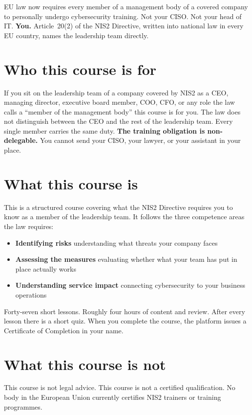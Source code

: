 \documentclass[11pt,a4paper,twoside]{book}
\begin{document}
EU law now requires every member of a management body of a covered company to personally undergo cybersecurity training. Not your CISO. Not your head of IT. \textbf{You.} Article~20(2) of the NIS2 Directive, written into national law in every EU country, names the leadership team directly.

\section*{Who this course is for}

If you sit on the leadership team of a company covered by NIS2 as a CEO, managing director, executive board member, COO, CFO, or any role the law calls a ``member of the management body''  this course is for you. The law does not distinguish between the CEO and the rest of the leadership team. Every single member carries the same duty. \textbf{The training obligation is non-delegable.} You cannot send your CISO, your lawyer, or your assistant in your place.

\section*{What this course is}

This is a structured course covering what the NIS2 Directive requires you to know as a member of the leadership team. It follows the three competence areas the law requires:
\begin{itemize}
  \item \textbf{Identifying risks} understanding what threats your company faces
  \item \textbf{Assessing the measures} evaluating whether what your team has put in place actually works
  \item \textbf{Understanding service impact} connecting cybersecurity to your business operations
\end{itemize}

Forty-seven short lessons. Roughly four hours of content and review. After every lesson there is a short quiz. When you complete the course, the platform issues a Certificate of Completion in your name.

\section*{What this course is not}

This course is not legal advice. This course is not a certified qualification. No body in the European Union currently certifies NIS2 trainers or training programmes.
\end{document}
